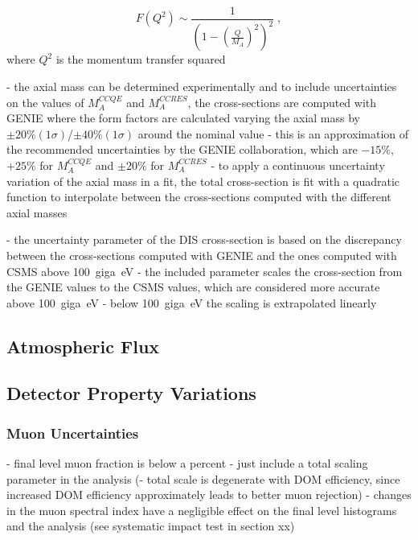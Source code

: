 \begin{equation}
    F(Q^2) \sim \frac{1}{(1 - (\frac{Q}{M_A})^2)^2}
    \;,
\end{equation}
where $Q^2$ is the momentum transfer squared


- the axial mass can be determined experimentally and to include uncertainties on the values of $M_A^{CCQE}$ and $M_A^{CCRES}$, the cross-sections are computed with \textsc{GENIE} where the form factors are calculated varying the axial mass by $\pm 20\% (1\sigma)$/$\pm 40\% (1\sigma)$ around the nominal value
- this is an approximation of the recommended uncertainties by the GENIE collaboration, which are $-15\%$, $+25\%$ for $M_A^{CCQE}$ and $\pm 20\%$ for $M_A^{CCRES}$ \cite{genie}
- to apply a continuous uncertainty variation of the axial mass in a fit, the total cross-section is fit with a quadratic function to interpolate between the cross-sections computed with the different axial masses


- the uncertainty parameter of the DIS cross-section is based on the discrepancy between the cross-sections computed with GENIE and the ones computed with CSMS  above \SI{100}{giga\electronvolt}
- the included parameter scales the cross-section from the GENIE values to the CSMS values, which are considered more accurate above \SI{100}{giga\electronvolt}
- below \SI{100}{giga\electronvolt} the scaling is extrapolated linearly


\subsection{Atmospheric Flux}

\subsection{Detector Property Variations}

\subsubsection{Muon Uncertainties}

- final level muon fraction is below a percent
- just include a total scaling parameter in the analysis
(- total scale is degenerate with DOM efficiency, since increased DOM efficiency approximately leads to better muon rejection)
- changes in the muon spectral index have a negligible effect on the final level histograms and the analysis (see systematic impact test in section xx)

